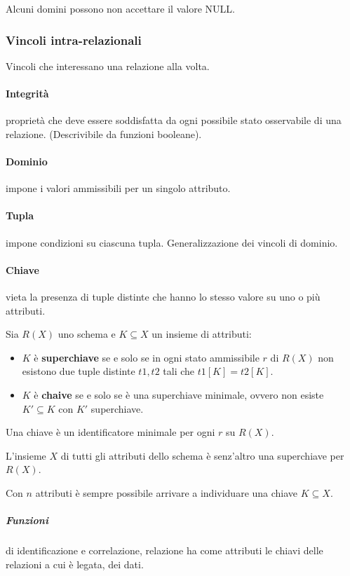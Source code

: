 Alcuni domini possono non accettare il valore NULL.

\subsubsection{Vincoli intra-relazionali}
Vincoli che interessano una relazione alla volta.
\paragraph{Integrità} proprietà che deve essere soddisfatta da ogni possibile stato osservabile di una relazione. (Descrivibile da funzioni booleane).

\paragraph{Dominio} impone i valori ammissibili per un singolo attributo.

\paragraph{Tupla} impone condizioni su ciascuna tupla. Generalizzazione dei vincoli di dominio.

\paragraph{Chiave} vieta la presenza di tuple distinte che hanno lo stesso valore su uno o più attributi.

Sia $R(X)$ uno schema e $K\subseteq X$ un insieme di attributi:
\begin{itemize}
	\item $K$ è \textbf{superchiave} se e solo se in ogni stato ammissibile $r$ di $R(X)$ non esistono due tuple distinte $t1, t2$ tali che $t1[K]=t2[K]$.
	\item $K$ è \textbf{chaive} se e solo se è una superchiave minimale, ovvero non esiste $K'\subseteq K$ con $K'$ superchiave.
\end{itemize}
Una chiave è un identificatore minimale per ogni $r$ su $R(X)$.

L'insieme $X$ di tutti gli attributi dello schema è senz'altro una superchiave per $R(X)$.

Con $n$ attributi è sempre possibile arrivare a individuare una chiave $K\subseteq X$.

\subparagraph{Funzioni} di identificazione e correlazione, relazione ha come attributi le chiavi delle relazioni a cui è legata, dei dati.

